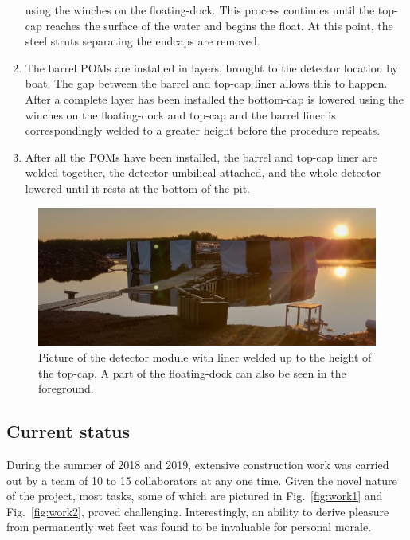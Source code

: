 \begin{enumerate}
          using the winches on the floating-dock. This process continues until the top-cap reaches
          the surface of the water and begins the float. At this point, the steel struts
          separating the endcaps are removed.
    \item The barrel POMs are installed in layers, brought to the detector location by boat. The
          gap between the barrel and top-cap liner allows this to happen. After a complete layer
          has been installed the bottom-cap is lowered using the winches on the floating-dock and
          top-cap and the barrel liner is correspondingly welded to a greater height before the
          procedure repeats.
    \item After all the POMs have been installed, the barrel and top-cap liner are welded
          together, the detector umbilical attached, and the whole detector lowered until it rests
          at the bottom of the pit.
\end{enumerate}

\begin{figure} %
    \includegraphics[width=\textwidth]{diagrams/4-chips/chips_with_liner_sun.jpeg}
    \caption[Picture of the \chipsfive detector module with liner]
    {Picture of the \chipsfive detector module with liner welded up to the height of the top-cap.
        A part of the floating-dock can also be seen in the foreground.}
    \label{fig:chips_with_liner}
\end{figure}

\subsection{Current status} %
\label{sec:chips_detector_status} %

During the summer of 2018 and 2019, extensive \chipsfive construction work was carried out by a
team of 10 to 15 collaborators at any one time. Given the novel nature of the project, most tasks,
some of which are pictured in Fig.~\ref{fig:work1} and Fig.~\ref{fig:work2}, proved challenging.
Interestingly, an ability to derive pleasure from permanently wet feet was found to be invaluable
for personal morale.

